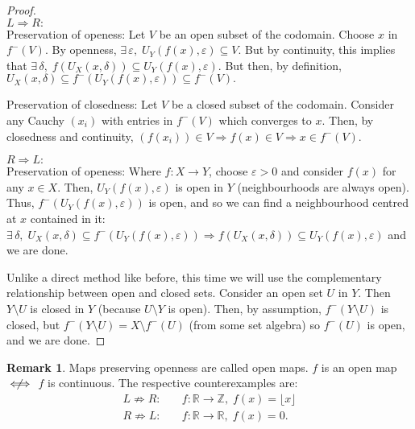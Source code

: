 \documentclass{article}
\theoremstyle{definition}
\newtheorem{rmk}{Remark}[subsubsection]
\begin{document}
\begin{proof}
	$ $\\$L\Rightarrow R:$\\
	Preservation of openess: Let $V$ be an open subset of the codomain. Choose $x$ in $f^-(V)$. By openness, $\exists\,\varepsilon,\;U_Y(f(x),\varepsilon)\subseteq V$. But by continuity, this implies that $\exists\,\delta,\;f(U_X(x,\delta))\subseteq U_Y(f(x),\varepsilon).$ But then, by definition, $U_X(x,\delta)\subseteq f^-(U_Y(f(x),\varepsilon))\subseteq f^-(V).$\par
	Preservation of closedness: Let $V$ be a closed subset of the codomain. Consider any Cauchy $(x_i)$ with entries in $f^-(V)$ which converges to $x$. Then, by closedness and continuity, $(f(x_i))\in V\Rightarrow f(x)\in V\Rightarrow x\in f^-(V)$.\par
	$R\Rightarrow L:$\\
	Preservation of openess: Where $f:X\rightarrow Y$, choose $\varepsilon>0$ and consider $f(x)$ for any $x\in X$. Then, $U_Y(f(x),\varepsilon)$ is open in $Y$ (neighbourhoods are always open). Thus, $f^-(U_Y(f(x),\varepsilon))$ is open, and so we can find a neighbourhood centred at $x$ contained in it:
	$\exists\,\delta,\;U_X(x,\delta)\subseteq f^-(U_Y(f(x),\varepsilon))\Rightarrow f(U_X(x,\delta))\subseteq U_Y(f(x),\varepsilon)$ and we are done.
	\par
	Unlike a direct method like before, this time we will use the complementary relationship between open and closed sets. Consider an open set $U$ in $Y$. Then $Y\setminus U$ is closed in $Y$ (because $U\setminus Y$ is open). Then, by assumption, $f^-(Y\setminus U)$ is closed, but $f^-(Y\setminus U)=X\setminus f^-(U)$ (from some set algebra) so $f^-(U)$ is open, and we are done.
\end{proof}
\begin{rmk}
	Maps preserving openness are called open maps. $f$ is an open map $\centernot\iff$ $f$ is continuous. The respective counterexamples are:
	\begin{align*}
		L\not\Rightarrow R:&\quad f:\mathbb{R}\rightarrow \mathbb{Z},\;f(x)=\lfloor x\rfloor\\
		R\not\Rightarrow L:&\quad f:\mathbb{R}\rightarrow \mathbb{R},\;f(x)=0.
	\end{align*}
\end{rmk}
\newpage
\end{document}
